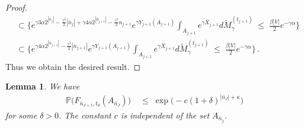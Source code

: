 \documentclass[11pt]{article}
\numberwithin{equation}{section}
\newtheorem{lemma}[theorem]{Lemma}
\theoremstyle{definition}
\renewcommand{\tilde}{\widetilde}          %
\renewcommand{\leq}{\;\leqslant\;}                   %
\renewcommand{\P}{\mathbb{P}}
\newcommand{\ab}{|}
\newcommand{\grea}{>}
\newcommand{\Pb}{\P}
\begin{document}
\begin{proof}
\begin{align*}
&  \subset \big\{ e^{\gamma 3 \alpha 2^{| \bar n_{j} | }  - \frac{\gamma^2}{2} |\bar n_{j}| + \gamma 4 \alpha 2^{|\bar n_{j+1}|} - \frac{\gamma^2}{2} n_{j+1} } e^{\gamma Y_{j+1}(A_{j+1})} \int_{A_{j+1}}e^{\gamma \bar X_{j+1}}  d \tilde M_\gamma^{(t_{j+1})} \leq \tfrac{\beta \ab V \ab }{2} e^{-\gamma \alpha} \big\} \\
& \subset \big\{ e^{\gamma 4 \alpha 2^{|\bar n_{j+1}\ab } - \frac{\gamma^2}{2} |\bar n_{j+1}|} e^{\gamma Y_{j+1}(A_{j+1})} \int_{A_{j+1}}e^{\gamma \bar X_{j+1}}  d \tilde M_\gamma^{(t_{j+1})} \leq \tfrac{\beta \ab V \ab }{2} e^{-\gamma \alpha} \big\}\,.
\end{align*}
Thus we obtain the desired result.

\end{proof}

\begin{lemma}\label{terminator}
We have
\begin{align*}
\Pb \big(F_{\bar n_{J+1}, t_0}(A_{\bar n_J})  \big) & \leq \exp \big( - c (1+\delta)^{\ab \bar n_J \ab + \kappa }  \big)
\end{align*}
for some $\delta \grea 0$. The constant $c$ is independent of the set $A_{\bar n_j}$.
\end{lemma}
\end{document}
